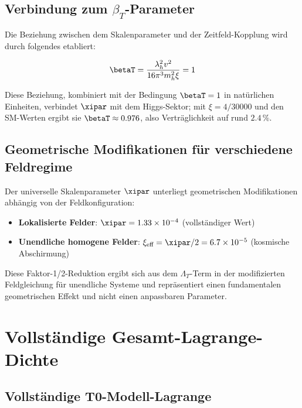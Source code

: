 	\subsection{Verbindung zum $\beta_T$-Parameter}
	\label{subsec:beta_t_verbindung}
	
	Die Beziehung zwischen dem Skalenparameter und der Zeitfeld-Kopplung wird durch folgendes etabliert:
	
	\begin{equation}
		\betaT = \frac{\lambda_h^2 v^2}{16\pi^3 m_h^2 \xi} = 1
		\label{eq:beta_t_beziehung}
	\end{equation}
	
	Diese Beziehung, kombiniert mit der Bedingung $\betaT = 1$ in natürlichen Einheiten, verbindet $\xipar$ mit dem Higgs-Sektor; mit $\xi = 4/30000$ und den SM-Werten ergibt sie $\betaT \approx 0.976$, also Verträglichkeit auf rund $2.4\,\%$.
	
	\subsection{Geometrische Modifikationen für verschiedene Feldregime}
	\label{subsec:geometrische_modifikationen}
	
	Der universelle Skalenparameter $\xipar$ unterliegt geometrischen Modifikationen abhängig von der Feldkonfiguration:
	
	\begin{itemize}
		\item \textbf{Lokalisierte Felder}: $\xipar = 1.33 \times 10^{-4}$ (vollständiger Wert)
		\item \textbf{Unendliche homogene Felder}: $\xi_{\text{eff}} = \xipar/2 = 6.7 \times 10^{-5}$ (kosmische Abschirmung)
	\end{itemize}
	
	Diese Faktor-1/2-Reduktion ergibt sich aus dem $\Lambda_T$-Term in der modifizierten Feldgleichung für unendliche Systeme und repräsentiert einen fundamentalen geometrischen Effekt und nicht einen anpassbaren Parameter.
	
	\section{Vollständige Gesamt-Lagrange-Dichte}
	\label{sec:gesamt_lagrange}
	
	\subsection{Vollständige T0-Modell-Lagrange}
	\label{subsec:vollstaendige_lagrange}
	

